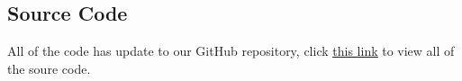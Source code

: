 \documentclass[10pt,twocolumn,letterpaper]{article}
\begin{document}
\subsection{Source Code} \label{app3}

All of the code has update to our GitHub repository, click \href{https://github.com/LovelyBuggies/Jupyter_DeepLearning_Homework/tree/master/Identify-Cactus/project/src}{\underline{this link}} to view all of the soure code.
\end{document}
